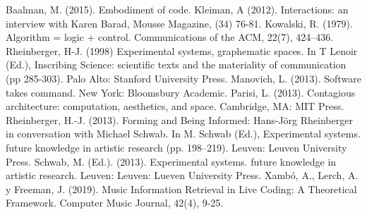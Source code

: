 Baalman, M. (2015). Embodiment of code. 
Kleiman, A (2012). Interactions: an interview with Karen Barad, Mousse Magazine, (34) 76-81.
Kowalski, R. (1979). Algorithm = logic + control. Communications of the ACM, 22(7), 424–436.
Rheinberger, H-J. (1998) Experimental systems, graphematic spaces. In T Lenoir (Ed.), Inscribing Science: scientific texts and the materiality of communication (pp 285-303). Palo Alto: Stanford University Press.
Manovich, L. (2013). Software takes command. New York: Bloomsbury Academic.
Parisi, L. (2013). Contagious architecture: computation, aesthetics, and space. Cambridge, MA:
MIT Press.
Rheinberger, H.-J. (2013). Forming and Being Informed: Hans-Jörg Rheinberger in conversation with Michael Schwab. In M. Schwab (Ed.), Experimental systems. future knowledge in artistic research (pp. 198–219). Leuven: Leuven University Press.
Schwab, M. (Ed.). (2013). Experimental systems. future knowledge in artistic research. Leuven: Leuven: Lueven University Press.
Xambó, A., Lerch, A. y Freeman, J. (2019). Music Information Retrieval in Live Coding: A Theoretical Framework. Computer Music Journal, 42(4), 9-25.

